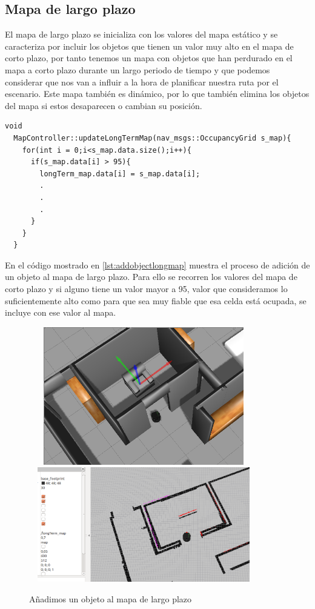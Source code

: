 \subsection{Mapa de largo plazo}
El mapa de largo plazo se inicializa con los valores del mapa estático y se caracteriza por incluir los objetos que tienen un valor muy alto en el mapa de corto plazo, por tanto tenemos un mapa con objetos que han perdurado en el mapa a corto plazo durante un largo periodo de tiempo y que podemos considerar que nos van a influir a la hora de planificar nuestra ruta por el escenario. 
Este mapa también es dinámico, por lo que también elimina los objetos del mapa si estos desaparecen o cambian su posición.
\pagebreak 

\begin{lstlisting}[caption=Procedimiento para añadir un objeto al mapa de largo plazo, label={lst:addobjectlongmap}]
  void
  MapController::updateLongTermMap(nav_msgs::OccupancyGrid s_map){
    for(int i = 0;i<s_map.data.size();i++){
      if(s_map.data[i] > 95){
        longTerm_map.data[i] = s_map.data[i]; 
        .
        .
        .
      }
    }
  }

\end{lstlisting}

En el código mostrado en \ref{lst:addobjectlongmap} muestra el proceso de adición de un objeto al mapa de largo plazo. Para ello se recorren los valores del mapa de corto plazo y si alguno tiene un valor mayor a 95, valor que consideramos lo suficientemente alto como para que sea muy fiable que esa celda está ocupada, se incluye con ese valor al mapa.

\begin{figure}[H]
  \begin{center}
    \includegraphics[width=10cm,height=6cm]{img/cap5/addingobject-gazebo}
    \includegraphics[width=10cm,height=5cm]{img/cap5/addingobject-longmap}
  \end{center}
  \caption{Añadimos un objeto al mapa de largo plazo}
  \label{fig:addobjectlongmap}
\end{figure}
\pagebreak



